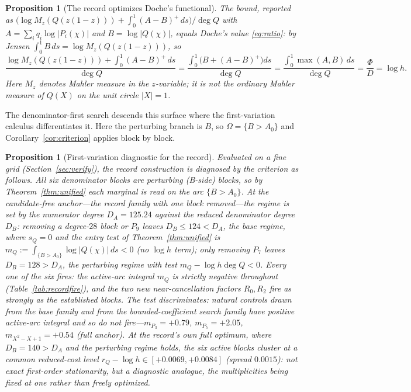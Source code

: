 \documentclass[11pt,reqno]{amsart}
\theoremstyle{plain}
\newtheorem{proposition}[theorem]{Proposition}
\theoremstyle{definition}
\theoremstyle{remark}
\newcommand{\rQ}{r_Q}
\newcommand{\dA}{D_A}
\newcommand{\dB}{D_B}
\begin{document}
\begin{proposition}[The record optimizes Doche's functional]\label{prop:samefunctional}
The \citet{Gri26} bound, reported as
$\bigl(\log M_z(Q(z(1-z)))+\int_0^1(A-B)^+\,ds\bigr)/\deg Q$ with
$A=\sum_iq_i\log|P_i(\chi)|$ and $B=\log|Q(\chi)|$, equals Doche's value
\eqref{eq:ratio}: by Jensen
$\int_0^1 B\,ds=\log M_z(Q(z(1-z)))$, so
\begin{equation}\label{eq:samefunctional}
  \frac{\log M_z(Q(z(1-z)))+\int_0^1(A-B)^+\,ds}{\deg Q}
  =\frac{\int_0^1\bigl(B+(A-B)^+\bigr)ds}{\deg Q}
  =\frac{\int_0^1\max(A,B)\,ds}{\deg Q}=\frac{\Phi}{D}=\log h.
\end{equation}
Here $M_z$ denotes Mahler measure in the $z$-variable; it is not the ordinary Mahler
measure of $Q(X)$ on the unit circle $|X|=1$.
\end{proposition}

The denominator-first search descends this surface where the first-variation calculus
differentiates it. Here the perturbing branch is $B$, so $\Omega=\{B>A_0\}$ and
Corollary~\ref{cor:criterion} applies block by block.

\begin{proposition}[First-variation diagnostic for the record]\label{thm:record-fires}
Evaluated on a fine grid (Section~\ref{sec:verify}), the record construction is
diagnosed by the criterion as follows. All six denominator blocks are \emph{perturbing}
(B-side) blocks, so by Theorem~\ref{thm:unified} each marginal is read on the arc
$\{B>A_0\}$. At the candidate-free anchor---the record family with one block removed---the
regime is set by the numerator degree $\dA=125.24$ against the reduced denominator degree
$\dB$: removing a degree-$28$ block or $P_9$ leaves $\dB\le124<\dA$, the \emph{base}
regime, where $s_Q=0$ and the entry test of Theorem~\ref{thm:unified} is
$m_Q:=\int_{\{B>A_0\}}\log|Q(\chi)|\,ds<0$ (no $\log h$ term); only removing $P_7$ leaves
$\dB=128>\dA$, the perturbing regime with test $m_Q-\log h\deg Q<0$. Every one of the six
fires: the active-arc integral $m_Q$ is strictly negative throughout
(Table~\ref{tab:recordfire}), and the two new near-cancellation factors $R_0,R_2$ fire as
strongly as the established blocks. The test discriminates: natural controls drawn from
the base family and from the bounded-coefficient search family have \emph{positive}
active-arc integral and so do not fire---$m_{P_3}=+0.79$, $m_{P_5}=+2.05$,
$m_{X^2-X+1}=+0.54$ (full anchor). At the record's own \emph{full} optimum, where
$\dB=140>\dA$ and the perturbing regime holds, the six active blocks cluster at a common
reduced-cost level $\rQ-\log h\in[+0.0069,+0.0084]$ (spread $0.0015$): not exact
first-order stationarity, but a diagnostic analogue, the multiplicities being fixed at
one rather than freely optimized.
\end{proposition}
\end{document}
